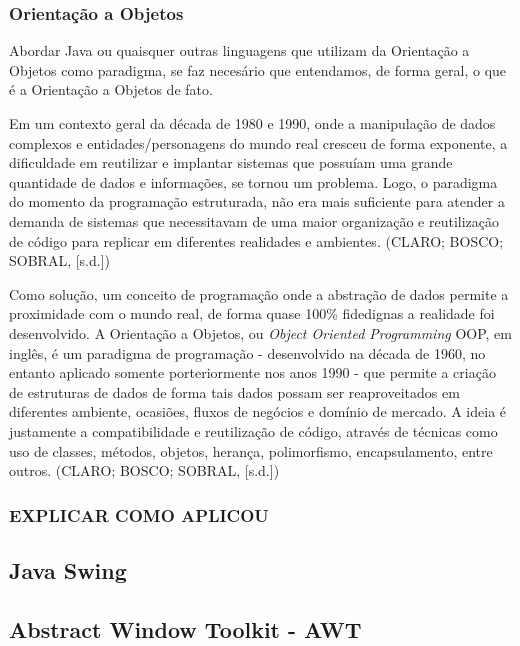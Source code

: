 \documentclass[a4paper,12pt]{article}
\begin{document}
\subsubsection{Orientação a Objetos}
Abordar Java ou quaisquer outras linguagens que utilizam da Orientação a Objetos como paradigma, se faz necesário que entendamos, de forma geral,
o que é a Orientação a Objetos de fato.

Em um contexto geral da década de 1980 e 1990, onde a manipulação de dados complexos e entidades/personagens do mundo real cresceu de forma exponente,
a dificuldade em reutilizar e implantar sistemas que possuíam uma grande quantidade de dados e informações, se tornou um problema. Logo, o paradigma do momento 
da programação estruturada, não era mais suficiente para atender a demanda de sistemas que necessitavam de uma maior organização e reutilização de código 
para replicar em diferentes realidades e ambientes. (CLARO; BOSCO; SOBRAL, [s.d.])

Como solução, um conceito de programação onde a abstração de dados permite a proximidade com o mundo real, de forma quase 100\% fidedignas a realidade foi desenvolvido.
A Orientação a Objetos, ou \textit{Object Oriented Programming} OOP, em inglês, é um paradigma de programação - desenvolvido na década de 1960, no entanto aplicado somente
porteriormente nos anos 1990 - que permite a criação de estruturas de dados de forma tais dados possam ser reaproveitados em diferentes 
ambiente, ocasiões, fluxos de negócios e domínio de mercado. A ideia é justamente a compatibilidade e reutilização de código,
através de técnicas como uso de classes, métodos, objetos, herança, polimorfismo, encapsulamento, entre outros. (CLARO; BOSCO; SOBRAL, [s.d.])

\subsubsection{EXPLICAR COMO APLICOU}

\subsection{Java Swing}

\subsection{Abstract Window Toolkit - AWT}
\end{document}
